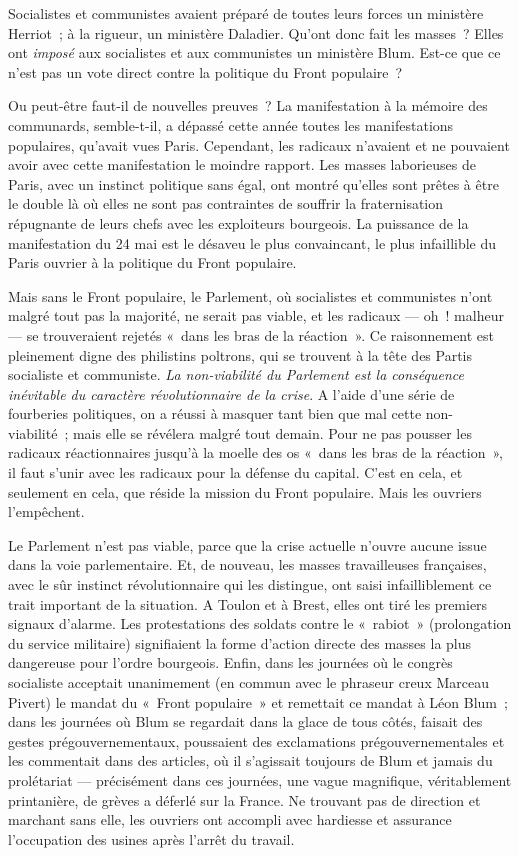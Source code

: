 \documentclass[french,twoside]{book} %
\begin{document}
Socialistes et communistes avaient préparé de toutes leurs forces un ministère Herriot ; à la rigueur, un ministère Daladier. Qu’ont donc fait les masses ? Elles ont \emph{imposé }aux socialistes et aux communistes un ministère Blum. Est-ce que ce n’est pas un vote direct contre la politique du Front populaire ?\par
Ou peut-être faut-il de nouvelles preuves ? La manifestation à la mémoire des communards, semble-t-il, a dépassé cette année toutes les manifestations populaires, qu’avait vues Paris. Cependant, les radicaux n’avaient et ne pouvaient avoir avec cette manifestation le moindre rapport. Les masses laborieuses de Paris, avec un instinct politique sans égal, ont montré qu’elles sont prêtes à être le double là où elles ne sont pas contraintes de souffrir la fraternisation répugnante de leurs chefs avec les exploiteurs bourgeois. La puissance de la manifestation du 24 mai est le désaveu le plus convaincant, le plus infaillible du Paris ouvrier à la politique du Front populaire.\par
Mais sans le Front populaire, le Parlement, où socialistes et communistes n’ont malgré tout pas la majorité, ne serait pas viable, et les radicaux — oh ! malheur — se trouveraient rejetés « dans les bras de la réaction ». Ce raisonnement est pleinement digne des philistins poltrons, qui se trouvent à la tête des Partis socialiste et communiste. \emph{La non-viabilité du Parlement est la conséquence inévitable du caractère révolutionnaire de la crise}. A l’aide d’une série de fourberies politiques, on a réussi à masquer tant bien que mal cette non-viabilité ; mais elle se révélera malgré tout demain. Pour ne pas pousser les radicaux réactionnaires jusqu’à la moelle des os « dans les bras de la réaction », il faut s’unir avec les radicaux pour la défense du capital. C’est en cela, et seulement en  cela, que réside la mission du Front populaire. Mais les ouvriers l’empêchent.\par
Le Parlement n’est pas viable, parce que la crise actuelle n’ouvre aucune issue dans la voie parlementaire. Et, de nouveau, les masses travailleuses françaises, avec le sûr instinct révolutionnaire qui les distingue, ont saisi infailliblement ce trait important de la situation. A Toulon et à Brest, elles ont tiré les premiers signaux d’alarme. Les protestations des soldats contre le « rabiot » (prolongation du service militaire) signifiaient la forme d’action directe des masses la plus dangereuse pour l’ordre bourgeois. Enfin, dans les journées où le congrès socialiste acceptait unanimement (en commun avec le phraseur creux Marceau Pivert) le mandat du « Front populaire » et remettait ce mandat à Léon Blum ; dans les journées où Blum se regardait dans la glace de tous côtés, faisait des gestes prégouvernementaux, poussaient des exclamations prégouvernementales et les commentait dans des articles, où il s’agissait toujours de Blum et jamais du prolétariat — précisément dans ces journées, une vague magnifique, véritablement printanière, de grèves a déferlé sur la France. Ne trouvant pas de direction et marchant sans elle, les ouvriers ont accompli avec hardiesse et assurance l’occupation des usines après l’arrêt du travail.\par
\end{document}
